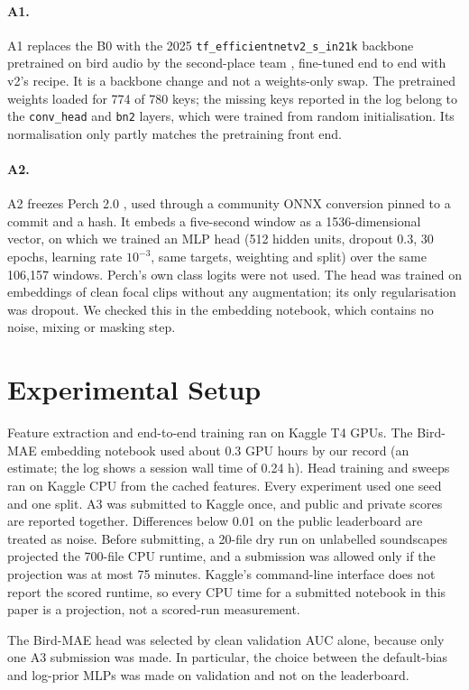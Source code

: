 \documentclass[letterpaper]{article} %
\begin{document}
\paragraph{A1.}
A1 replaces the B0 with the 2025 \texttt{tf\_efficientnetv2\_s\_in21k} backbone pretrained on bird audio by the second-place team \citep{sydorskyi2025tackling}, fine-tuned end to end with v2's recipe. It is a backbone change and not a weights-only swap. The pretrained weights loaded for 774 of 780 keys; the missing keys reported in the log belong to the \texttt{conv\_head} and \texttt{bn2} layers, which were trained from random initialisation. Its normalisation only partly matches the pretraining front end.

\paragraph{A2.}
A2 freezes Perch 2.0 \citep{vanmerrienboer2025perch}, used through a community ONNX conversion pinned to a commit and a hash. It embeds a five-second window as a 1536-dimensional vector, on which we trained an MLP head (512 hidden units, dropout 0.3, 30 epochs, learning rate $10^{-3}$, same targets, weighting and split) over the same 106,157 windows. Perch's own class logits were not used. The head was trained on embeddings of clean focal clips without any augmentation; its only regularisation was dropout. We checked this in the embedding notebook, which contains no noise, mixing or masking step.

\section{Experimental Setup}
Feature extraction and end-to-end training ran on Kaggle T4 GPUs. The Bird-MAE embedding notebook used about 0.3 GPU hours by our record (an estimate; the log shows a session wall time of 0.24 h). Head training and sweeps ran on Kaggle CPU from the cached features. Every experiment used one seed and one split. A3 was submitted to Kaggle once, and public and private scores are reported together. Differences below 0.01 on the public leaderboard are treated as noise. Before submitting, a 20-file dry run on unlabelled soundscapes projected the 700-file CPU runtime, and a submission was allowed only if the projection was at most 75 minutes. Kaggle's command-line interface does not report the scored runtime, so every CPU time for a submitted notebook in this paper is a projection, not a scored-run measurement.

The Bird-MAE head was selected by clean validation AUC alone, because only one A3 submission was made. In particular, the choice between the default-bias and log-prior MLPs was made on validation and not on the leaderboard.
\end{document}
